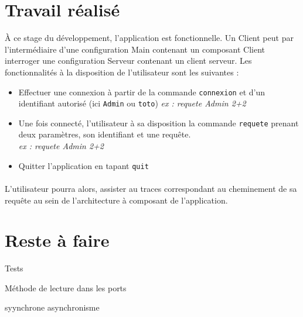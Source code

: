 \documentclass[12pt]{article}
\begin{document}
\section{Travail réalisé}
À ce stage du développement, l'application est fonctionnelle. Un Client peut par l'intermédiaire d'une configuration \og Main \fg{} contenant un composant Client interroger une configuration Serveur contenant un client serveur. Les fonctionnalités à la disposition de l'utilisateur sont les suivantes :
\begin{itemize}
\item
  Effectuer une connexion à partir de la commande \verb+connexion+ et d'un identifiant autorisé (ici \verb+Admin+ ou \verb+toto+)
  \emph{ex : requete Admin 2+2}
\item
  Une fois connecté, l'utilisateur à sa disposition la commande \verb+requete+ prenant deux paramètres, son identifiant et une requête.  \hfill \\ 
  \emph{ex : requete Admin 2+2}
\item
  Quitter l'application en tapant \verb+quit+
\end{itemize}
\paragraph{}

L'utilisateur pourra alors, assister au traces correspondant au cheminement de sa requête au sein de l'architecture à composant de l'application.


\section{Reste à faire}
Tests

Méthode de lecture dans les ports

syynchrone asynchronisme
\end{document}
